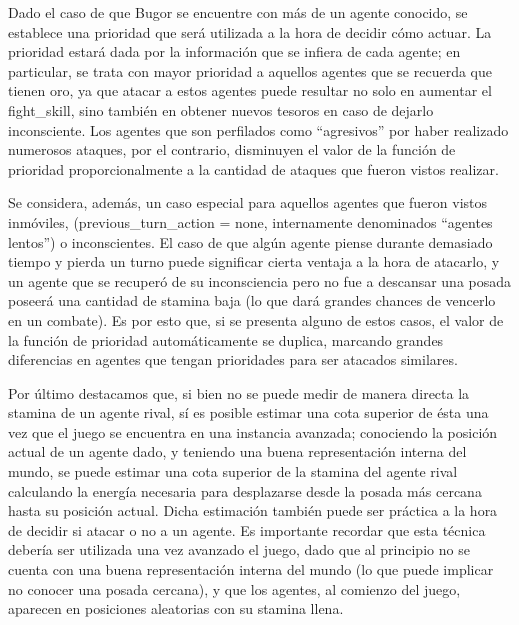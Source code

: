 \documentclass[a4paper,10pt,spanish]{article}
\begin{document}
	Dado el caso de que Bugor se encuentre con m\'as de un agente conocido, se establece una prioridad que ser\'a utilizada a la hora de decidir c\'omo actuar. La prioridad estar\'a dada por la informaci\'on que se infiera de cada agente; en particular, se trata con mayor prioridad a aquellos agentes que se recuerda que tienen oro, ya que atacar a estos agentes puede resultar no solo en aumentar el fight\_skill, sino tambi\'en en obtener nuevos tesoros en caso de dejarlo inconsciente. Los agentes que son perfilados como ``agresivos'' por haber realizado numerosos ataques, por el contrario, disminuyen el valor de la funci\'on de prioridad proporcionalmente a la cantidad de ataques que fueron vistos realizar.
	
	Se considera, adem\'as, un caso especial para aquellos agentes que fueron vistos inm\'oviles, (previous\_turn\_action = none, internamente denominados ``agentes lentos'') o inconscientes. El caso de que alg\'un agente piense durante demasiado tiempo y pierda un turno puede significar cierta ventaja a la hora de atacarlo, y un agente que se recuper\'o de su inconsciencia pero no fue a descansar una posada poseer\'a una cantidad de stamina baja (lo que dar\'a grandes chances de vencerlo en un combate). Es por esto que, si se presenta alguno de estos casos, el valor de la funci\'on de prioridad autom\'aticamente se duplica, marcando grandes diferencias en agentes que tengan prioridades para ser atacados similares.
	
	Por \'ultimo destacamos que, si bien no se puede medir de manera directa la stamina de un agente rival, s\'i es posible estimar una cota superior	de \'esta una vez que el juego se encuentra en una instancia avanzada; conociendo la posici\'on actual de un agente dado, y teniendo una buena representaci\'on interna del mundo, se puede estimar una cota superior de la stamina del agente rival calculando la energ\'ia necesaria para desplazarse desde la posada m\'as cercana hasta su posici\'on actual. Dicha estimaci\'on tambi\'en puede ser pr\'actica a la hora de decidir si atacar o no a un agente. Es importante recordar que esta t\'ecnica deber\'ia ser utilizada una vez avanzado el juego, dado que al principio no se cuenta con una buena representaci\'on interna del mundo (lo que puede implicar no conocer una posada cercana), y que los agentes, al comienzo del juego, aparecen en posiciones aleatorias con su stamina llena.
	
% 	
	
\end{document}
